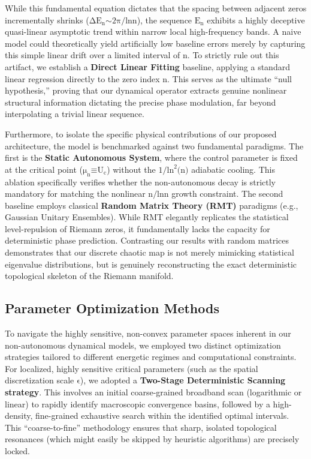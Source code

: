 While this fundamental equation dictates that the spacing between
adjacent zeros incrementally shrinks
(\(\text{Δ}\text{E}_{\text{n}}\text{∼2}\text{π}\text{/ln}\text{n}\)),
the sequence \(\text{E}_{\text{n}}\) exhibits a highly deceptive
quasi-linear asymptotic trend within narrow local high-frequency bands.
A naive model could theoretically yield artificially low baseline errors
merely by capturing this simple linear drift over a limited interval of
\(\text{n}\). To strictly rule out this artifact, we establish a
\textbf{Direct Linear Fitting} baseline, applying a standard linear
regression directly to the zero index \(\text{n}\). This serves as the
ultimate ``null hypothesis,'' proving that our dynamical operator
extracts genuine nonlinear structural information dictating the precise
phase modulation, far beyond interpolating a trivial linear sequence.

Furthermore, to isolate the specific physical contributions of our
proposed architecture, the model is benchmarked against two fundamental
paradigms. The first is the \textbf{Static Autonomous System}, where the
control parameter is fixed at the critical point
(\(\text{μ}_{\text{n}}\text{≡}\text{U}_{\text{c}}\)) without the
\(\text{1/}\text{ln}^{\text{2}}\text{(}\text{n}\text{)}\) adiabatic
cooling. This ablation specifically verifies whether the non-autonomous
decay is strictly mandatory for matching the nonlinear
\(\text{n}\text{/ln}\text{n}\) growth constraint. The second baseline
employs classical \textbf{Random Matrix Theory (RMT)} paradigms (e.g.,
Gaussian Unitary Ensembles). While RMT elegantly replicates the
statistical level-repulsion of Riemann zeros, it fundamentally lacks the
capacity for deterministic phase prediction. Contrasting our results
with random matrices demonstrates that our discrete chaotic map is not
merely mimicking statistical eigenvalue distributions, but is genuinely
reconstructing the exact deterministic topological skeleton of the
Riemann manifold.

\subsection*{Parameter Optimization Methods}

To navigate the highly sensitive, non-convex parameter spaces inherent
in our non-autonomous dynamical models, we employed two distinct
optimization strategies tailored to different energetic regimes and
computational constraints. For localized, highly sensitive critical
parameters (such as the spatial discretization scale \(\text{ϵ}\)), we
adopted a \textbf{Two-Stage Deterministic Scanning strategy}. This
involves an initial coarse-grained broadband scan (logarithmic or
linear) to rapidly identify macroscopic convergence basins, followed by
a high-density, fine-grained exhaustive search within the identified
optimal intervals. This ``coarse-to-fine'' methodology ensures that
sharp, isolated topological resonances (which might easily be skipped by
heuristic algorithms) are precisely locked.


